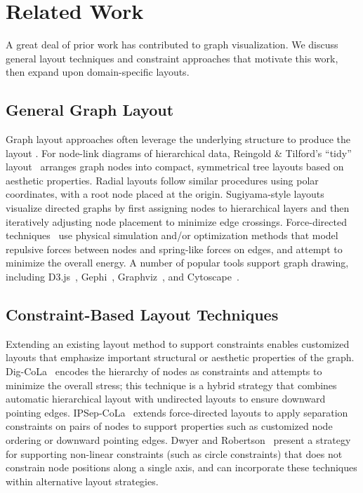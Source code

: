 \vspace{-5px}
\section{Related Work}
A great deal of prior work has contributed to graph visualization.
We discuss general layout techniques and constraint approaches
that motivate this work, then expand upon domain-specific layouts.

\vspace{-5px}
\subsection{General Graph Layout}
Graph layout approaches often leverage the underlying structure to produce the 
layout \cite{herman2000graph,eades2010graph,gibson2013survey}.
For node-link diagrams of hierarchical data, Reingold \& Tilford's ``tidy'' 
layout~\cite{reingold1981tidier} arranges graph nodes into compact, 
symmetrical tree layouts based on aesthetic properties.
Radial layouts \cite{battista1998graph,herman2000graph} follow similar procedures using polar 
coordinates, with a root node placed at the origin.
Sugiyama-style layouts~\cite{sugiyama1981methods} visualize directed graphs by first assigning nodes to hierarchical layers and then iteratively adjusting node placement to minimize edge crossings.
Force-directed techniques~\cite{tutte1963draw,quinn1979forced,fruchterman1991graph,kobourov2012spring} 
use physical simulation and/or optimization methods that model repulsive forces between nodes and spring-like forces on edges, and attempt to minimize the overall energy. 
A number of popular tools support graph drawing, including D3.js~\cite{bostock:d3}, Gephi~\cite{bastian2009gephi},
Graphviz~\cite{ellson2001graphviz}, and Cytoscape~\cite{shannon2003cytoscape}.

\subsection{Constraint-Based Layout Techniques}
Extending an existing layout method to support constraints enables customized 
layouts that emphasize important structural or aesthetic properties of the graph. 
Dig-CoLa~\cite{dwyer2005dig} encodes the hierarchy of nodes as constraints
and attempts to minimize the overall stress; this technique
is a hybrid strategy that combines automatic hierarchical 
layout with undirected layouts to ensure downward pointing edges. 
\mbox{IPSep-CoLa~\cite{dwyer2006ipsep}} extends
force-directed layouts to apply separation constraints 
on pairs of nodes to support properties such as customized node ordering or
downward pointing edges.
Dwyer and Robertson~\cite{dwyer2009layout} present a strategy for supporting 
non-linear constraints (such as circle constraints) that does not constrain node
positions along a single axis, and can incorporate these techniques within
alternative layout strategies. 

